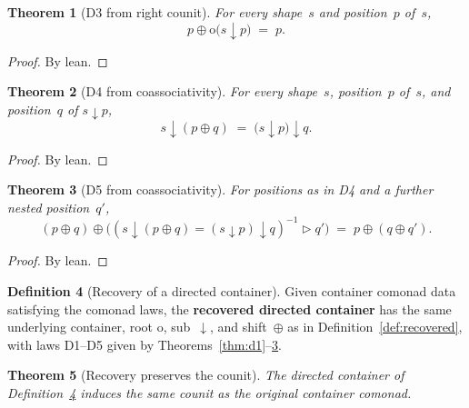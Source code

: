 \documentclass[11pt,a4paper]{article}
\theoremstyle{plain}
\newtheorem{theorem}{Theorem}[section]
\theoremstyle{definition}
\newtheorem{definition}[theorem]{Definition}
\newcommand{\rootp}{\mathrm{o}}
\begin{document}
\begin{theorem}[D3 from right counit]\label{thm:d3}
For every shape~$s$ and position~$p$ of~$s$,
\begin{equation}
  p \oplus \rootp\bigl(s \downarrow p\bigr) \;=\; p.
\end{equation}
\end{theorem}

\begin{proof}
By lean.
\end{proof}

\begin{theorem}[D4 from coassociativity]\label{thm:d4}
For every shape~$s$, position~$p$ of~$s$, and position~$q$ of
$s \downarrow p$,
\begin{equation}
  s \downarrow (p \oplus q) \;=\; \bigl(s \downarrow p\bigr) \downarrow q.
\end{equation}
\end{theorem}

\begin{proof}
By lean.
\end{proof}

\begin{theorem}[D5 from coassociativity]\label{thm:d5}
For positions as in D4 and a further nested position~$q'$,
\begin{equation}
  (p \oplus q) \oplus
    \bigl((s \downarrow (p \oplus q)
      = (s \downarrow p) \downarrow q)^{-1}
      \mathbin{\triangleright} q'\bigr)
  \;=\;
  p \oplus (q \oplus q').
\end{equation}
\end{theorem}

\begin{proof}
By lean.
\end{proof}

\begin{definition}[Recovery of a directed container]\label{def:to-directed}
Given container comonad data satisfying the comonad laws, the
\textbf{recovered directed container} has the same underlying container, root
$\rootp$, sub~$\downarrow$, and shift~$\oplus$ as in
Definition~\ref{def:recovered}, with laws D1--D5 given by
Theorems~\ref{thm:d1}--\ref{thm:d5}.
\end{definition}

\begin{theorem}[Recovery preserves the counit]\label{thm:counit-same}
The directed container of Definition~\ref{def:to-directed} induces the same
counit as the original container comonad.
\end{theorem}
\end{document}
